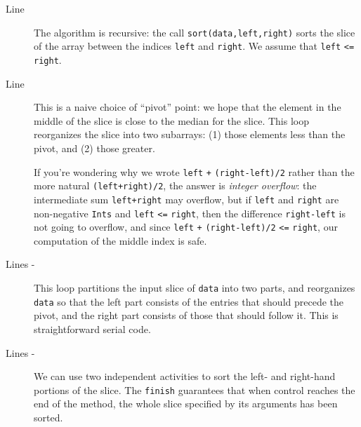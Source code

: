 \begin{description}
\item[Line ] 
The algorithm is recursive: the call {\tt sort(data,left,right)} sorts the slice 
of the array between the indices {\tt left} and {\tt right}.  We assume that
{\tt left} {\tt <=} {\tt right}.

\item[Line ]
This is a naive choice of ``pivot'' point: we hope that the element in the middle
of the slice is close to the median for the slice.
This loop reorganizes the slice into
two subarrays: (1) those elements less than the pivot, and (2) those greater.

\begin{finepoint}
If you're wondering why we wrote {\tt left} {\tt +} {\tt (right-left)/2} rather than
the more natural {\tt (left+right)/2}, the answer is {\em integer overflow}: the intermediate sum
{\tt left+right} may overflow, but if {\tt left} and {\tt right} are non-negative
{\tt Ints} and {\tt left} {\tt <=} {\tt right}, then the difference {\tt right-left} is not
going to overflow, and since {\tt left} {\tt +} {\tt (right-left)/2}
{\tt <=} {\tt right}, our computation of the middle index is safe.
\end{finepoint}

\item[Lines -] 
This loop partitions the input slice of {\tt data} into two parts,
and reorganizes {\tt data} so that the left part consists of the entries that
should precede the pivot, and the right part consists of those that should
follow it.  This is straightforward serial code. 

\item[Lines -] 
We can use two independent activities to sort the left- and right-hand
portions of the slice.   The {\tt finish} guarantees that when control reaches
the end of the method, the whole slice specified by its arguments has been sorted.  
\end{description}

